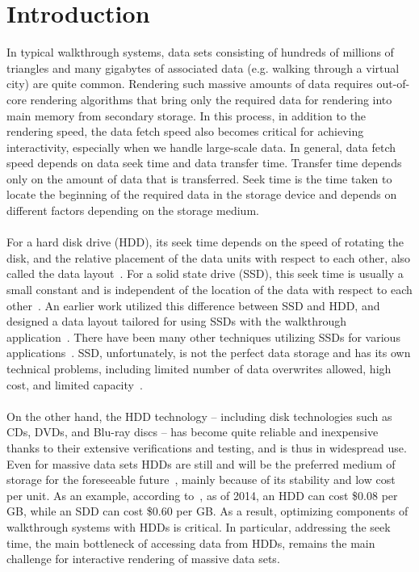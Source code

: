 
\section{Introduction}


In typical walkthrough systems, data sets consisting of hundreds of millions of
triangles and many gigabytes of associated data (e.g. walking through a virtual
city) are quite common. Rendering such massive amounts of data requires
out-of-core rendering algorithms that bring only the required data for
rendering into main memory from secondary storage. In this process, in addition
to the rendering speed, the data fetch speed also becomes critical for
achieving interactivity, especially when we handle large-scale data. In
general, data fetch speed depends on data seek time and data transfer time.
Transfer time depends only on the amount of data that is transferred. Seek time
is the time taken to locate the beginning of the required data in the storage
device and depends on different factors depending on the storage medium. \\
\\
For a hard disk drive (HDD), its seek time depends on the speed of rotating the
disk,
and the relative placement of the data units with respect to each other, also
called the data layout~\cite{Rizvi10}. For a solid state drive (SSD), this seek
time is usually a small constant and is independent of the location of the data
with respect to each other~\cite{SSD_perf08}. An earlier work utilized this
difference between SSD and HDD, and designed a data layout tailored for using
SSDs with the walkthrough application~\cite{ssdpaper}. There have been many
other techniques utilizing SSDs for various applications~\cite{FlashVM09}. SSD,
unfortunately, is not the perfect data storage and has its own technical
problems, including limited number of data overwrites allowed, high cost, and
limited capacity~\cite{Rizvi10}.  \\
\\
On the other hand, the HDD technology -- including disk technologies such as
CDs, DVDs, and Blu-ray discs -- has become quite reliable and inexpensive
thanks to their extensive verifications and testing, and is thus in widespread
use.  Even for massive data sets HDDs are still and will be
the preferred medium of storage for the foreseeable future~\cite{Rizvi10},
mainly
because of its stability and low cost per unit. As an example, according
to~\cite{pcmagarticle}, as of 2014, an HDD can cost \$0.08 per GB, while an SDD
can cost \$0.60 per GB. As a result, optimizing components of walkthrough
systems with HDDs is critical. In particular, addressing the seek time, the
main bottleneck of accessing data from HDDs, remains the main challenge for
interactive rendering of massive data sets. 

